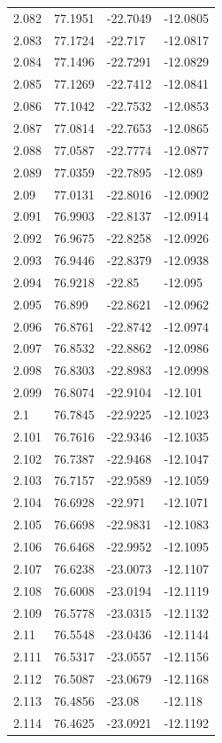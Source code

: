 \begin{tabular}{llll}
2.082 & 77.1951 & -22.7049 & -12.0805 \\
2.083 & 77.1724 & -22.717 & -12.0817 \\
2.084 & 77.1496 & -22.7291 & -12.0829 \\
2.085 & 77.1269 & -22.7412 & -12.0841 \\
2.086 & 77.1042 & -22.7532 & -12.0853 \\
2.087 & 77.0814 & -22.7653 & -12.0865 \\
2.088 & 77.0587 & -22.7774 & -12.0877 \\
2.089 & 77.0359 & -22.7895 & -12.089 \\
2.09 & 77.0131 & -22.8016 & -12.0902 \\
2.091 & 76.9903 & -22.8137 & -12.0914 \\
2.092 & 76.9675 & -22.8258 & -12.0926 \\
2.093 & 76.9446 & -22.8379 & -12.0938 \\
2.094 & 76.9218 & -22.85 & -12.095 \\
2.095 & 76.899 & -22.8621 & -12.0962 \\
2.096 & 76.8761 & -22.8742 & -12.0974 \\
2.097 & 76.8532 & -22.8862 & -12.0986 \\
2.098 & 76.8303 & -22.8983 & -12.0998 \\
2.099 & 76.8074 & -22.9104 & -12.101 \\
2.1 & 76.7845 & -22.9225 & -12.1023 \\
2.101 & 76.7616 & -22.9346 & -12.1035 \\
2.102 & 76.7387 & -22.9468 & -12.1047 \\
2.103 & 76.7157 & -22.9589 & -12.1059 \\
2.104 & 76.6928 & -22.971 & -12.1071 \\
2.105 & 76.6698 & -22.9831 & -12.1083 \\
2.106 & 76.6468 & -22.9952 & -12.1095 \\
2.107 & 76.6238 & -23.0073 & -12.1107 \\
2.108 & 76.6008 & -23.0194 & -12.1119 \\
2.109 & 76.5778 & -23.0315 & -12.1132 \\
2.11 & 76.5548 & -23.0436 & -12.1144 \\
2.111 & 76.5317 & -23.0557 & -12.1156 \\
2.112 & 76.5087 & -23.0679 & -12.1168 \\
2.113 & 76.4856 & -23.08 & -12.118 \\
2.114 & 76.4625 & -23.0921 & -12.1192 \\

\end{tabular}
